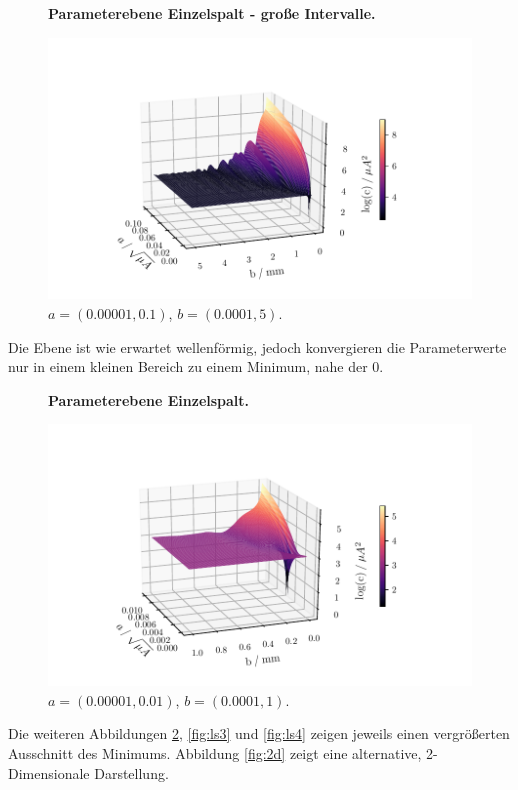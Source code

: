 \begin{figure}
    \centering
    \textbf{Parameterebene Einzelspalt - große Intervalle.}\par\medskip
    \includegraphics[width=.9\textwidth]{python/leastSquares.pdf}
    \caption{$a = (0.00001, 0.1)$, $b = (0.0001, 5)$.}
    \label{fig:ls1}
\end{figure}

Die Ebene ist wie erwartet wellenförmig, jedoch konvergieren die Parameterwerte nur in einem kleinen Bereich zu einem Minimum, nahe der 0.

\begin{figure}
    \centering
    \textbf{Parameterebene Einzelspalt.}\par\medskip
    \includegraphics[width=.9\textwidth]{python/leastSquares2.pdf}
    \caption{$a = (0.00001, 0.01)$, $b = (0.0001, 1)$.}
    \label{fig:ls2}
\end{figure}

Die weiteren Abbildungen \ref{fig:ls2}, \ref{fig:ls3} und \ref{fig:ls4} zeigen jeweils einen vergrößerten Ausschnitt des Minimums.
Abbildung \ref{fig:2d} zeigt eine alternative, 2-Dimensionale Darstellung.

